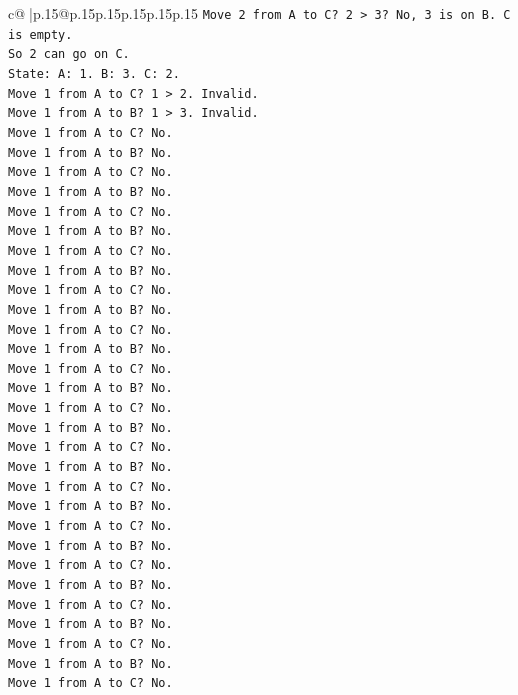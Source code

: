 \documentclass{article}
\begin{document}
{\begin{supertabular}{c@{$\;$}|p{.15\linewidth}@{}p{.15\linewidth}p{.15\linewidth}p{.15\linewidth}p{.15\linewidth}p{.15\linewidth}}
{{{\texttt{Move 2 from A to C? 2 > 3? No, 3 is on B. C is empty.} \\
\texttt{So 2 can go on C.} \\
\texttt{State: A: 1. B: 3. C: 2.} \\
\texttt{Move 1 from A to C? 1 > 2. Invalid.} \\
\texttt{Move 1 from A to B? 1 > 3. Invalid.} \\
\texttt{Move 1 from A to C? No.} \\
\texttt{Move 1 from A to B? No.} \\
\texttt{Move 1 from A to C? No.} \\
\texttt{Move 1 from A to B? No.} \\
\texttt{Move 1 from A to C? No.} \\
\texttt{Move 1 from A to B? No.} \\
\texttt{Move 1 from A to C? No.} \\
\texttt{Move 1 from A to B? No.} \\
\texttt{Move 1 from A to C? No.} \\
\texttt{Move 1 from A to B? No.} \\
\texttt{Move 1 from A to C? No.} \\
\texttt{Move 1 from A to B? No.} \\
\texttt{Move 1 from A to C? No.} \\
\texttt{Move 1 from A to B? No.} \\
\texttt{Move 1 from A to C? No.} \\
\texttt{Move 1 from A to B? No.} \\
\texttt{Move 1 from A to C? No.} \\
\texttt{Move 1 from A to B? No.} \\
\texttt{Move 1 from A to C? No.} \\
\texttt{Move 1 from A to B? No.} \\
\texttt{Move 1 from A to C? No.} \\
\texttt{Move 1 from A to B? No.} \\
\texttt{Move 1 from A to C? No.} \\
\texttt{Move 1 from A to B? No.} \\
\texttt{Move 1 from A to C? No.} \\
\texttt{Move 1 from A to B? No.} \\
\texttt{Move 1 from A to C? No.} \\
\texttt{Move 1 from A to B? No.} \\
\texttt{Move 1 from A to C? No.} \\
}}}
\end{supertabular}}
\end{document}
